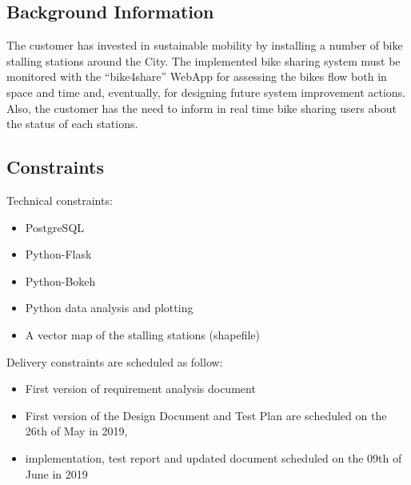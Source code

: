 \documentclass{article}
\begin{document}
\subsection{Background Information}

The  customer has invested in sustainable mobility by installing a number of bike stalling stations around the City. The implemented bike sharing system must be monitored with the “bike4share” WebApp for assessing the bikes flow both in space and time and, eventually, for designing future system improvement actions. 
Also, the customer has the need to inform in real time bike sharing users about the status of each stations.

\subsection{Constraints}
Technical constraints:
\begin{itemize}
    \item PostgreSQL
    \item Python-Flask 
    \item Python-Bokeh
    \item Python data analysis and plotting
    \item A vector map of the stalling stations (shapefile)
\end{itemize}
Delivery constraints are scheduled as follow:
\begin{itemize}
     \item First version of requirement analysis document	
     \item First version of the Design Document and Test Plan are scheduled on the 26th of May in 2019,
     \item implementation, test report and updated document scheduled on the 09th of June in 2019 
\end{itemize}
\end{document}

